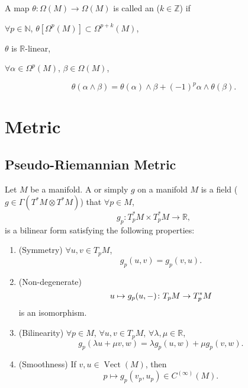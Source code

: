 \documentclass[openany, oneside, a5paper]{book}
\DeclareMathOperator{\Vect}{Vect}
\begin{document}
\begin{definition}[Antiderivation]\label{def: antiderivation}
    A map $\theta \colon \Omega(M) \to \Omega(M)$ is called an  ($k \in \mathbb Z$) if 
    \begin{enumerate*}[label=\roman*)]
        \item $\forall p \in \mathbb N$, $\theta[\Omega^p(M)] \subset \Omega^{p+k}(M)$, 
        \item $\theta$ is $\mathbb R$-linear, 
        \item $\forall \alpha \in \Omega^p(M)$,
        $\beta \in \Omega(M)$,
    \end{enumerate*}
    \begin{equation}
        \theta (\alpha \wedge \beta) 
        = \theta (\alpha) \wedge \beta
            + (-1)^p \alpha \wedge \theta (\beta).
    \end{equation}
\end{definition}

\chapter{Metric}
\section{Pseudo-Riemannian Metric}
\begin{definition}
    Let $M$ be a manifold.
    A  or simply  $g$ on a manifold $M$ is a field ($g \in \Gamma(T^*M \otimes T^*M)$) that $\forall p \in M$, 
    \begin{equation}
        g_p \colon T^*_p M \times T^*_p M \to \mathbb R, 
    \end{equation}
    is a bilinear form satisfying the following properties:
    \begin{enumerate}[label=(\alph*)]
        \item (Symmetry) $\forall u, v \in T_p M$,
        \begin{equation}
            g_p(u, v) = g_p(v, u).
        \end{equation}
        \item (Non-degenerate)
        \begin{equation}
            u \mapsto g_p(u, -) \colon T_p M \to T^*_p M 
        \end{equation}
        is an isomorphism.
        \item (Bilinearity) $\forall p \in M$, $\forall u, v \in T_p M$, $\forall \lambda, \mu \in \mathbb R$,
        \begin{equation}
            g_p(\lambda u + \mu v, w) = \lambda g_p(u, w) + \mu g_p(v, w).
        \end{equation}
        \item (Smoothness) If $v, u \in \Vect(M)$, then
        \begin{equation}
            p \mapsto g_p(v_p, u_p) \in C^{(\infty)}(M).
        \end{equation}
    \end{enumerate}
\end{definition}
\end{document}
